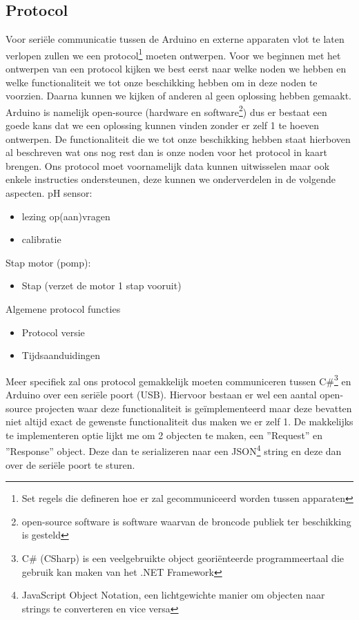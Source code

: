 \documentclass[11pt]{report}
\newcommand{\pbr}{\hfill\break\hfill\break}
\begin{document}
\subsection{Protocol}
Voor seriële communicatie tussen de Arduino en externe apparaten vlot te laten verlopen zullen we een protocol\footnote{Set regels die defineren hoe er zal gecommuniceerd worden tussen apparaten} moeten ontwerpen.
Voor we beginnen met het ontwerpen van een protocol kijken we best eerst naar welke noden we hebben en welke functionaliteit we tot onze beschikking hebben om in deze noden te voorzien. Daarna kunnen we kijken of anderen al geen oplossing hebben gemaakt. Arduino is namelijk open-source (hardware en software\footnote{open-source software is software waarvan de broncode publiek ter beschikking is gesteld}) dus er bestaat een goede kans dat we een oplossing kunnen vinden zonder er zelf 1 te hoeven ontwerpen. De functionaliteit die we tot onze beschikking hebben staat hierboven al beschreven wat ons nog rest dan is onze noden voor het protocol in kaart brengen.
\pbr
Ons protocol moet voornamelijk data kunnen uitwisselen maar ook enkele instructies ondersteunen, deze kunnen we onderverdelen in de volgende aspecten.
\pbr
pH sensor:
\begin{itemize}
    \setlength{\itemsep}{0pt}
    \item lezing op(aan)vragen
    \item calibratie
\end{itemize}
Stap motor (pomp):
\begin{itemize}
    \setlength{\itemsep}{0pt}
    \item Stap (verzet de motor 1 stap vooruit)
\end{itemize}
Algemene protocol functies
\begin{itemize}
    \setlength{\itemsep}{0pt}
    \item Protocol versie
    \item Tijdsaanduidingen
\end{itemize}
Meer specifiek zal ons protocol gemakkelijk moeten communiceren tussen C\#\footnote{C\# (CSharp) is een veelgebruikte object georiënteerde programmeertaal die gebruik kan maken van het .NET Framework} en Arduino over een seriële poort (USB). Hiervoor bestaan er wel een aantal open-source projecten waar deze functionaliteit is geïmplementeerd maar deze bevatten niet altijd exact de gewenste functionaliteit dus maken we er zelf 1.
\pbr
De makkelijks te implementeren optie lijkt me om 2 objecten te maken, een ''Request'' en ''Response'' object. Deze dan te serializeren naar een JSON\footnote{JavaScript Object Notation, een lichtgewichte manier om objecten naar strings te converteren en vice versa} string en deze dan over de seriële poort te sturen.
\end{document}
